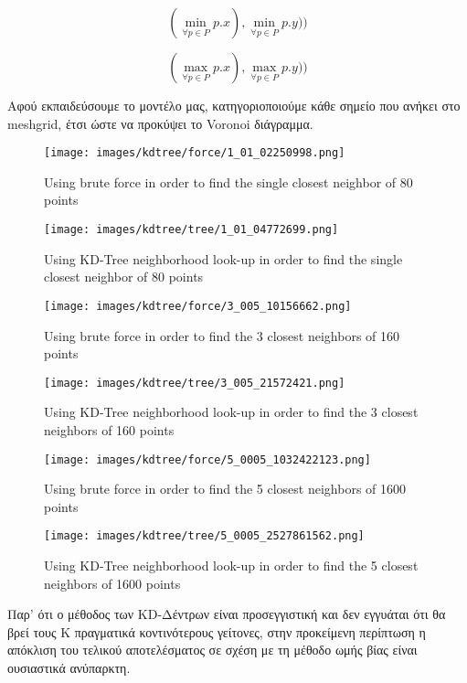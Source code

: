 \documentclass[12pt]{article}
\newenvironment{matlab}
	{\begin{figure}[H]\centering\captionsetup{justification=centering}}
	{\end{figure}}
\begin{document}
\[ (\min_{\forall p \in P} p.x), \min_{\forall p \in P} p.y)) \]

\[ (\max_{\forall p \in P} p.x), \max_{\forall p \in P} p.y)) \]

Αφού εκπαιδεύσουμε το μοντέλο μας, κατηγοριοποιούμε κάθε σημείο που ανήκει
στο meshgrid, έτσι ώστε να προκύψει το Voronoi διάγραμμα. \\

\begin{matlab}
    \texttt{[image: images/kdtree/force/1\_01\_02250998.png]}
    \caption{Using brute force in order to find the single closest neighbor of 80 points}
\end{matlab}

\begin{matlab}
    \texttt{[image: images/kdtree/tree/1\_01\_04772699.png]}
    \caption{Using KD-Tree neighborhood look-up in order to find the single closest neighbor of 80 points}
\end{matlab}

\begin{matlab}
    \texttt{[image: images/kdtree/force/3\_005\_10156662.png]}
    \caption{Using brute force in order to find the 3 closest neighbors of 160 points}
\end{matlab}

\begin{matlab}
    \texttt{[image: images/kdtree/tree/3\_005\_21572421.png]}
    \caption{Using KD-Tree neighborhood look-up in order to find the 3 closest neighbors of 160 points}
\end{matlab}

\begin{matlab}
    \texttt{[image: images/kdtree/force/5\_0005\_1032422123.png]}
    \caption{Using brute force in order to find the 5 closest neighbors of 1600 points}
\end{matlab}

\begin{matlab}
    \texttt{[image: images/kdtree/tree/5\_0005\_2527861562.png]}
    \caption{Using KD-Tree neighborhood look-up in order to find the 5 closest neighbors of 1600 points}
\end{matlab}

\pagebreak

Παρ' ότι ο μέθοδος των KD-Δέντρων είναι προσεγγιστική και δεν εγγυάται
ότι θα βρεί τους Κ πραγματικά κοντινότερους γείτονες,
στην προκείμενη περίπτωση η απόκλιση του τελικού αποτελέσματος
σε σχέση με τη μέθοδο ωμής βίας είναι ουσιαστικά ανύπαρκτη. \\
\end{document}
